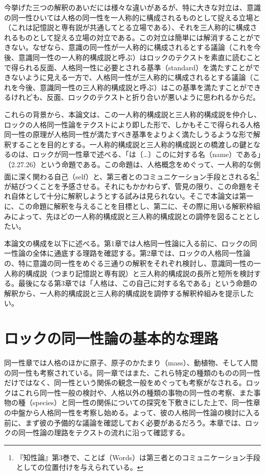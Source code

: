 \documentclass[a4j,oneside]{jsbook}
\begin{document}
\par
今挙げた三つの解釈のあいだには様々な違いがあるが、特に大きな対立は、意識の同一性ひいては人格の同一性を一人称的に構成されるものとして捉える立場と（これは記憶説と専有説が共通してとる立場である）、それを三人称的に構成されるものとして捉える立場の対立である。この対立は簡単には解消することができない。なぜなら、意識の同一性が一人称的に構成されるとする議論（これを今後、意識同一性の一人称的構成説と呼ぶ）はロックのテクストを素直に読むことで得られる反面、人格同一性に必要とされる基準（standard）を満たすことができないように見える一方で、人格同一性が三人称的に構成されるとする議論（これを今後、意識同一性の三人称的構成説と呼ぶ）はこの基準を満たすことができるけれども、反面、ロックのテクストと折り合いが悪いように思われるからだ。
\par
これらの背景から、本論文は、この一人称的構成説と三人称的構成説を仲介し、ロックの人格同一性論をテクストにより即した形で、しかもそこで得られる人格同一性の原理が人格同一性が満たすべき基準をよりよく満たしうるような形で解釈することを目的とする。一人称的構成説と三人称的構成説との橋渡しの鍵となるのは、ロックが同一性章で述べる、「は〔…〕このに対する名（name）である」（2.27.26）という命題である。この命題は、人格概念をめぐって、一人称的な側面に深く関わる自己（self）と、第三者とのコミュニケーション手段とされる名\footnote{『知性論』第3巻で、ことば（Words）は第三者とのコミュニケーション手段としての位置付けを与えられている。}が結びつくことを予感させる。それにもかかわらず、管見の限り、この命題をそれ自体として十分に解釈しようとする試みは見られない。そこで本論文は第一に、この命題に解釈を与えることを目標とし、第二に、その際に用いる解釈枠組みによって、先ほどの一人称的構成説と三人称的構成説との調停を図ることとしたい。
\par
本論文の構成を以下に述べる。第1章では人格同一性論に入る前に、ロックの同一性論の全体に通底する理路を確認する。第2章では、ロックの人格同一性論の、特に意識の同一性をめぐる三通りの解釈をそれぞれ検討し、意識同一性の一人称的構成説（つまり記憶説と専有説）と三人称的構成説の長所と短所を検討する。最後になる第3章では「人格は、この自己に対する名である」という命題の解釈から、一人称的構成説と三人称的構成説を調停する解釈枠組みを提示したい。
\chapter{
ロックの同一性論の基本的な理路
}
同一性章では人格のほかに原子、原子のかたまり（mass）、動植物、そして人間の同一性も考察されている。同一章ではまた、これら特定の種類のものの同一性だけではなく、同一性という関係の観念一般をめぐっても考察がなされる。ロックはこれら同一性一般の検討や、人格以外の種類の事物の同一性の考察、また事物の種（species）と同一性の関係についての探究を下敷きにした上で、同一性章の中盤から人格同一性を考察し始める。よって、彼の人格同一性論の検討に入る前に、まず彼の予備的な議論を確認しておく必要があるだろう。本章では、ロックの同一性論の理路をテクストの流れに沿って確認する。
\end{document}
